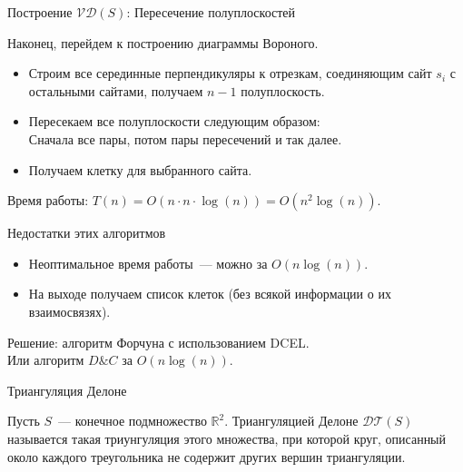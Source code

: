 \documentclass[12pt,aspectratio=169,svgnames]{beamer}
\begin{document}
    \begin{frame}{Построение $\mathcal{V}\mathcal{D}(S)$: Пересечение полуплоскостей}

        Наконец, перейдем к построению диаграммы Вороного.

        \begin{itemize}

            \item Строим все серединные перпендикуляры к отрезкам, соединяющим сайт $s_i$ с остальными сайтами, получаем $n - 1$ полуплоскость.

            \item Пересекаем все полуплоскости следующим образом: \\
                  Сначала все пары, потом пары пересечений и так далее.

            \item Получаем клетку для выбранного сайта.

        \end{itemize}

        Время работы: $T(n) = O(n \cdot n \cdot \log(n)) = O(n^2 \log(n))$.

    \end{frame}

    \begin{frame}{Недостатки этих алгоритмов}

        \begin{itemize}

            \item Неоптимальное время работы~--- можно за  $O(n \log(n))$.

            \item На выходе получаем список клеток (без всякой информации о их взаимосвязях).

        \end{itemize}

        Решение: алгоритм Форчуна с использованием DCEL.\\

        Или алгоритм $D\&C$ за $O(n\log(n))$.

    \end{frame}

    \begin{frame}{Триангуляция Делоне}

        \begin{defn}

            Пусть $S$~--- конечное подмножество $\mathbb{R}^2$.
            Триангуляцией Делоне  $\mathcal{D}\mathcal{T}(S)$  называется такая триунгуляция этого множества,
            при которой круг, описанный около каждого треугольника не содержит других вершин триангуляции.

        \end{defn}

    \end{frame}
\end{document}
